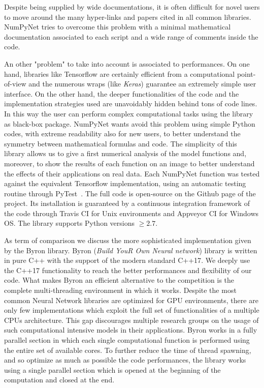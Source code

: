 \documentclass[12pt,a4paper]{report}
\begin{document}
Despite being supplied by wide documentations, it is often difficult for novel users to move around the many hyper-links and papers cited in all common libraries.
\textsf{NumPyNet} tries to overcome this problem with a minimal mathematical documentation associated to each script and a wide range of comments inside the code.

An other "problem" to take into account is associated to performances.
On one hand, libraries like \textsf{Tensorflow} are certainly efficient from a computational point-of-view and the numerous wraps (like \emph{Keras}) guarantee an extremely simple user interface.
On the other hand, the deeper functionalities of the code and the implementation strategies used are unavoidably hidden behind tons of code lines.
In this way the user can perform complex computational tasks using the library as black-box package.
\textsf{NumPyNet} wants avoid this problem using simple \textsf{Python} codes, with extreme readability also for new users, to better understand the symmetry between mathematical formulas and code.
The simplicity of this library allows us to give a first numerical analysis of the model functions and, moreover, to show the results of each function on an image to better understand the effects of their applications on real data.
Each \textsf{NumPyNet} function was tested against the equivalent \textsf{Tensorflow} implementation, using an automatic testing routine through \textsf{PyTest}~\cite{PyTest}.
The full code is open-source on the \textsf{Github} page of the project.
Its installation is guaranteed by a continuous integration framework of the code through \textsf{Travis CI} for Unix environments and \textsf{Appveyor CI} for Windows OS.
The library supports \textsf{Python} versions $\ge2.7$.

As term of comparison we discuss the more sophisticated implementation given by the \textsf{Byron} library.
\textsf{Byron} (\emph{Build YouR Own Neural network}) library is written in pure \textsf{C++} with the support of the modern standard \textsf{C++17}.
We deeply use the \textsf{C++17} functionality to reach the better performances and flexibility of our code.
What makes \textsf{Byron} an efficient alternative to the competition is the complete multi-threading environment in which it works.
Despite the most common Neural Network libraries are optimized for GPU environments, there are only few implementations which exploit the full set of functionalities of a multiple CPUs architecture.
This gap discourages multiple research groups on the usage of such computational intensive models in their applications.
\textsf{Byron} works in a fully parallel section in which each single computational function is performed using the entire set of available cores.
To further reduce the time of thread spawning, and so optimize as much as possible the code performances, the library works using a single parallel section which is opened at the beginning of the computation and closed at the end.
\end{document}
